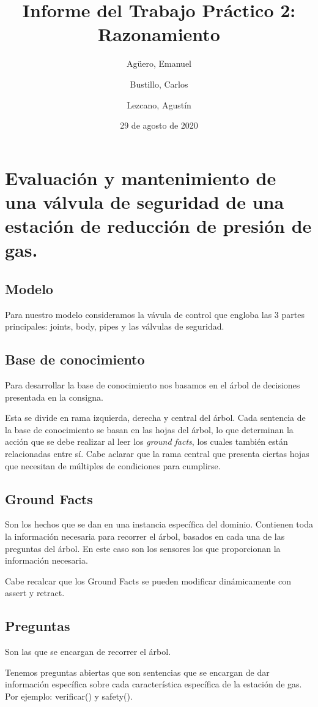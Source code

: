 \documentclass{article}
\title{Informe del Trabajo Práctico 2: Razonamiento}
\author{Agüero, Emanuel\\
\and
Bustillo, Carlos\\
\and
Lezcano, Agustín\\
}
\date{29 de agosto de 2020}
\begin{document}
\maketitle

\section{Evaluación y mantenimiento de una válvula de seguridad de una estación de reducción de presión de gas.}

\subsection{Modelo}
    Para nuestro modelo consideramos la vávula de control que engloba las 3 partes principales: joints, body, pipes y las válvulas de seguridad.

\subsection{Base de conocimiento}
    Para desarrollar la base de conocimiento nos basamos en el árbol de decisiones presentada en la consigna.
    
    Esta se divide en rama izquierda, derecha y central del árbol. Cada sentencia de la base de conocimiento se basan en las hojas del árbol, lo que determinan la acción que se debe realizar al leer los \textit{ground facts}, los cuales también están relacionadas entre sí. Cabe aclarar que la rama central que presenta ciertas hojas que necesitan de múltiples de condiciones para cumplirse. 

\subsection{Ground Facts}
    Son los hechos que se dan en una instancia específica del dominio. Contienen toda la información necesaria para recorrer el árbol, basados en cada una de las preguntas del árbol. En este caso son los sensores los que proporcionan la información necesaria. 
    
    Cabe recalcar que los Ground Facts se pueden modificar dinámicamente con assert y retract.

\subsection{Preguntas}
    Son las que se encargan de recorrer el árbol. 
    
    Tenemos preguntas abiertas que son sentencias que se encargan de dar información específica sobre cada característica específica de la estación de gas. Por ejemplo: verificar() y safety().
    
\end{document}
